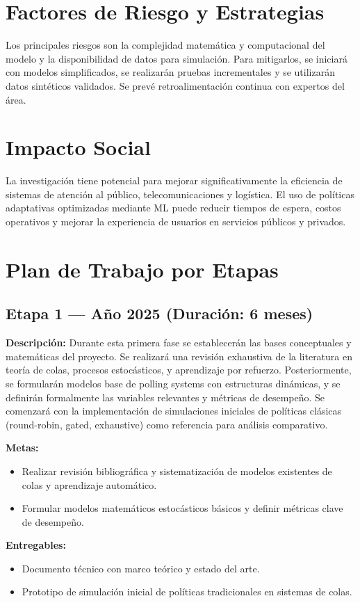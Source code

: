 \documentclass[12pt]{article}
\begin{document}
\section{Factores de Riesgo y Estrategias}
Los principales riesgos son la complejidad matemática y computacional del modelo y la disponibilidad de datos para simulación. Para mitigarlos, se iniciará con modelos simplificados, se realizarán pruebas incrementales y se utilizarán datos sintéticos validados. Se prevé retroalimentación continua con expertos del área.

\section{Impacto Social}
La investigación tiene potencial para mejorar significativamente la eficiencia de sistemas de atención al público, telecomunicaciones y logística. El uso de políticas adaptativas optimizadas mediante ML puede reducir tiempos de espera, costos operativos y mejorar la experiencia de usuarios en servicios públicos y privados.
\section{Plan de Trabajo por Etapas}

\subsection*{Etapa 1 — Año 2025 (Duración: 6 meses)}
\textbf{Descripción:} Durante esta primera fase se establecerán las bases conceptuales y matemáticas del proyecto. Se realizará una revisión exhaustiva de la literatura en teoría de colas, procesos estocásticos, y aprendizaje por refuerzo. Posteriormente, se formularán modelos base de polling systems con estructuras dinámicas, y se definirán formalmente las variables relevantes y métricas de desempeño. Se comenzará con la implementación de simulaciones iniciales de políticas clásicas (round-robin, gated, exhaustive) como referencia para análisis comparativo.

\textbf{Metas:}
\begin{itemize}
  \item Realizar revisión bibliográfica y sistematización de modelos existentes de colas y aprendizaje automático.
  \item Formular modelos matemáticos estocásticos básicos y definir métricas clave de desempeño.
\end{itemize}

\textbf{Entregables:}
\begin{itemize}
  \item Documento técnico con marco teórico y estado del arte.
  \item Prototipo de simulación inicial de políticas tradicionales en sistemas de colas.
\end{itemize}
\end{document}
